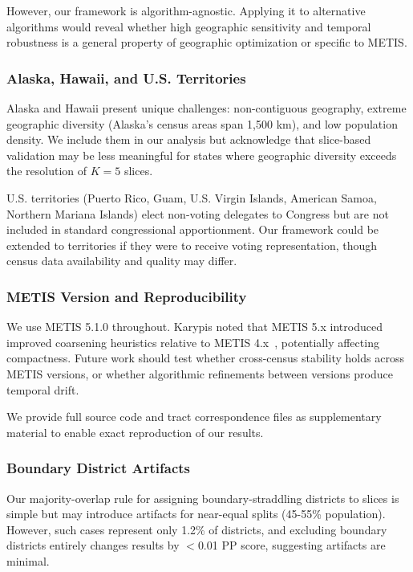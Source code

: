 However, our framework is algorithm-agnostic. Applying it to alternative algorithms would reveal whether high geographic sensitivity and temporal robustness is a general property of geographic optimization or specific to METIS.

\subsubsection{Alaska, Hawaii, and U.S. Territories}

Alaska and Hawaii present unique challenges: non-contiguous geography, extreme geographic diversity (Alaska's census areas span 1,500 km), and low population density. We include them in our analysis but acknowledge that slice-based validation may be less meaningful for states where geographic diversity exceeds the resolution of $K=5$ slices.

U.S. territories (Puerto Rico, Guam, U.S. Virgin Islands, American Samoa, Northern Mariana Islands) elect non-voting delegates to Congress but are not included in standard congressional apportionment. Our framework could be extended to territories if they were to receive voting representation, though census data availability and quality may differ.

\subsubsection{METIS Version and Reproducibility}

We use METIS 5.1.0 throughout. Karypis noted that METIS 5.x introduced improved coarsening heuristics relative to METIS 4.x~\cite{karypis2013metis5}, potentially affecting compactness. Future work should test whether cross-census stability holds across METIS versions, or whether algorithmic refinements between versions produce temporal drift.

We provide full source code and tract correspondence files as supplementary material to enable exact reproduction of our results.

\subsubsection{Boundary District Artifacts}

Our majority-overlap rule for assigning boundary-straddling districts to slices is simple but may introduce artifacts for near-equal splits (45-55\% population). However, such cases represent only 1.2\% of districts, and excluding boundary districts entirely changes results by $<$0.01 PP score, suggesting artifacts are minimal.

